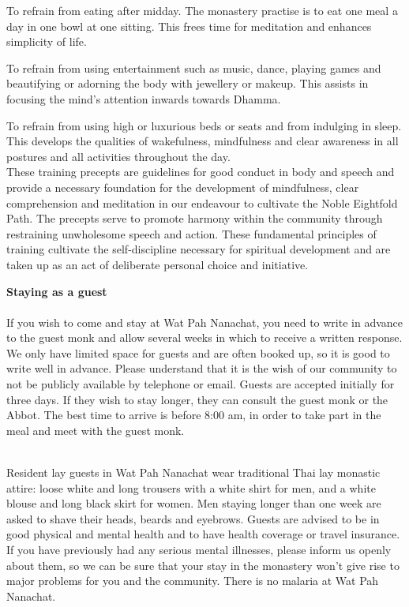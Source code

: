 To refrain from eating after midday. The monastery practise is to eat
one meal a day in one bowl at one sitting. This frees time for
meditation and enhances simplicity of life.

To refrain from using entertainment such as music, dance, playing games
and beautifying or adorning the body with jewellery or makeup. This
assists in focusing the mind's attention inwards towards Dhamma.

To refrain from using high or luxurious beds or seats and from indulging
in sleep. This develops the qualities of wakefulness, mindfulness and
clear awareness in all postures and all activities throughout the day.\\
These training precepts are guidelines for good conduct in body and
speech and provide a necessary foundation for the development of
mindfulness, clear comprehension and meditation in our endeavour to
cultivate the Noble Eightfold Path. The precepts serve to promote
harmony within the community through restraining unwholesome speech and
action. These fundamental principles of training cultivate the
self-discipline necessary for spiritual development and are taken up as
an act of deliberate personal choice and initiative.

\textbf{Staying as a guest}\\\\If you wish to come and stay at Wat Pah
Nanachat, you need to write in advance to the guest monk and allow
several weeks in which to receive a written response. We only have
limited space for guests and are often booked up, so it is good to write
well in advance. Please understand that it is the wish of our community
to not be publicly available by telephone or email. Guests are accepted
initially for three days. If they wish to stay longer, they can consult
the guest monk or the Abbot. The best time to arrive is before 8:00 am,
in order to take part in the meal and meet with the guest monk.

\\Resident lay guests in Wat Pah Nanachat wear traditional Thai lay
monastic attire: loose white and long trousers with a white shirt for
men, and a white blouse and long black skirt for women. Men staying
longer than one week are asked to shave their heads, beards and
eyebrows. Guests are advised to be in good physical and mental health
and to have health coverage or travel insurance. If you have previously
had any serious mental illnesses, please inform us openly about them, so
we can be sure that your stay in the monastery won't give rise to major
problems for you and the community. There is no malaria at Wat Pah
Nanachat.

